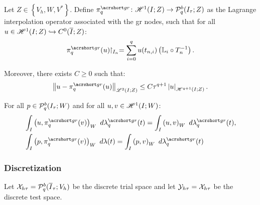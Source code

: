 \begin{definition}[$\InterpolantGR_q$] \label{def:interpolant_gr}
    Let $Z \in \left\{V_h, W, V^* \right\}$. Define $\InterpolantGR_q \colon \SpaceHk{1}(I; Z) \rightarrow \SpacePolynomials{q}^b(\TimeMesh; Z)$ as the Lagrange interpolation operator associated with the \acrshort{gr} nodes, such that for all $u \in \mathscr{H}^{1}(I; Z) \hookrightarrow C^0(\overline{I}; Z)$:
    \begin{align}
        \InterpolantGR_q(u) \Restriction_{I_n} = \sum_{i = 0}^q u(t_{n, i}) \left( \Lagrange_i \circ T_n^{-1} \right).
    \end{align}

    Moreover, there exists $C \geq 0$ such that:
    \begin{align}
        \left\lVert u - \InterpolantGR_q(u) \right\rVert_{\SpaceLp{2}(I; Z)} \leq C \tau^{q + 1} \left\lvert u \right\rvert_{\SpaceHk{q + 1}(I; Z)}.
    \end{align}
\end{definition}

\begin{proposition}
    For all $p \in \mathcal{P}_{q}^b(I_{\tau}; W)$ and for all $u, v \in \mathscr{H}^{1}(I; W)$:
    \begin{align}
        & \int_I \left( u, \InterpolantGR_q(v) \right)_W ~ d \lambdaGR_q(t) = \int_I \left( u, v \right)_W ~ d \lambdaGR_q(t), \\
        & \int_I \left( p, \InterpolantGR_q(v) \right)_W ~ d \lambda(t) = \int_I \left( p, v \right)_W ~ d \lambdaGR_q(t)
    \end{align}
\end{proposition}

\subsubsection{Discretization}

\begin{definition}
    Let $\mathcal{X}_{h \tau} = \mathcal{P}_{q}^b(\overline{I}_{\tau}; V_h)$ be the discrete trial space and let $\mathcal{Y}_{h \tau} = \mathcal{X}_{h \tau}$ be the discrete test space.
\end{definition}


